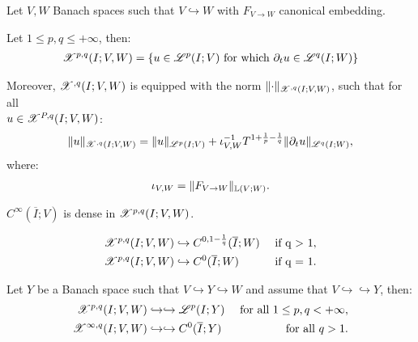 Let $V, W$ Banach spaces such that $V \hookrightarrow W$ with $F_{V \rightarrow W}$ canonical embedding.

\begin{definition}[$\SpaceXpq{p}{q}(I; V, W)$]
    Let $1 \leq p, q \leq +\infty$, then:
    \begin{align}
        \mathscr{X}^{p, q}(I; V, W) = \left\{ u \in \mathscr{L}^{p}(I; V) \text{ for which } \partial_t u \in \mathscr{L}^{q}(I; W) \right\}
    \end{align}

    Moreover, $\mathscr{X}^{, q}(I; V, W)$ is equipped with the norm $\lVert \cdot \rVert_{\mathscr{X}^{, q}(I; V, W)}$, such that for all \\ $u \in \mathscr{X}^{P, q}(I; V, W)$:
    \begin{align}
        \lVert u \rVert_{\mathscr{X}^{, q}(I; V, W)} = \lVert u \rVert_{\mathscr{L}^{p}(I; V)} + \iota_{V, W}^{-1}T^{1 + \frac{1}{p} - \frac{1}{q}} \lVert \partial_t u \rVert_{\mathscr{L}^{q}(I; W)},
    \end{align}
    where:
    \begin{align}
        \iota_{V, W} = \lVert F_{V \rightarrow W} \rVert_{\mathbb{L}(V;W)}.
    \end{align}
\end{definition}

\begin{theorem}
    $C^{\infty}(\overline{I}; V)$ is dense in $\SpaceXpq{p}{q}(I; V, W)$.
\end{theorem}

\begin{lemma}
    \begin{align}
        & \mathscr{X}^{p, q}(I; V, W) \hookrightarrow C^{0, 1 - \frac{1}{q}}(\overline{I}; W) & \text{ if q > 1}, \\
        & \mathscr{X}^{p, q}(I; V, W) \hookrightarrow C^{0}(\overline{I}; W) & \text{ if q = 1}.
    \end{align}
\end{lemma}

\begin{theorem}
    Let $Y$ be a Banach space such that $V \hookrightarrow Y \hookrightarrow W$ and assume that $V \hookrightarrow \hookrightarrow Y$, then:
    \begin{align}
        \mathscr{X}^{p, q}(I; V, W) &\hookrightarrow \hookrightarrow \mathscr{L}^{p}(I; Y) &\text{ for all } 1 \leq p, q < +\infty,\\
        \mathscr{X}^{\infty, q}(I; V, W) &\hookrightarrow \hookrightarrow C^0(\overline{I}; Y) &\text{ for all } q > 1.
    \end{align}
\end{theorem}

